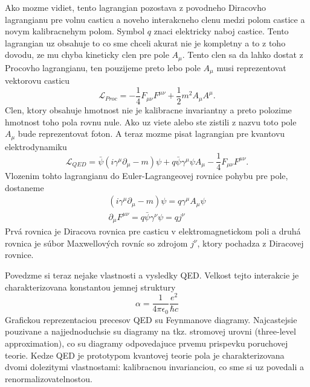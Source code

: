 \documentclass[../../main.tex]{subfiles}
\begin{document}
Ako mozme vidiet, tento lagrangian pozostava z povodneho Diracovho lagrangianu pre volnu casticu a noveho interakcneho clenu medzi polom castice a novym kalibracnehym polom. Symbol $q$ znaci elektricky naboj castice. Tento lagrangian uz obsahuje to co sme chceli akurat nie je kompletny a to z toho dovodu, ze mu chyba kineticky clen pre pole $A_{\mu}$. Tento clen sa da lahko dostat z Procovho lagrangianu, ten pouzijeme preto lebo pole $A_{\mu}$ musi reprezentovat vektorovu casticu
\begin{equation}
\mathcal{L}_{Proc}=-\frac{1}{4}F_{\mu\nu}F^{\mu\nu}+\frac{1}{2}m^2A_{\mu}A^{\mu}.
\end{equation}
Clen, ktory obsahuje hmotnost nie je kalibracne invariantny a preto polozime hmotnost toho pola rovnu nule. Ako uz viete alebo ste zistili z nazvu toto pole $A_{\mu}$ bude reprezentovat foton. A teraz mozme pisat lagrangian pre kvantovu elektrodynamiku
\begin{equation}
\mathcal{L}_{QED}=\bar{\psi}(i\gamma^{\mu}\partial_{\mu}-m)\psi+q\bar{\psi}\gamma^{\mu}\psi A_{\mu}-\frac{1}{4}F_{\mu\nu}F^{\mu\nu}.
\end{equation}
Vlozenim tohto lagrangianu do Euler-Lagrangeovej rovnice pohybu pre pole, dostaneme 
\begin{equation}
\begin{gathered}
(i\gamma^{\mu}\partial_{\mu}-m)\psi=q\gamma^{\mu}A_{\mu}\psi\\
\partial_{\mu}F^{\mu\nu}=q\bar{\psi}\gamma^{\nu}\psi=qj^{\nu}
\end{gathered}
\end{equation}
Prvá rovnica je Diracova rovnica pre casticu v elektromagnetickom poli a druhá rovnica je súbor Maxwellových rovníc so zdrojom $j^{\nu}$, ktory pochadza z Diracovej rovnice.\par
Povedzme si teraz nejake vlastnosti a vysledky QED.
Velkost tejto interakcie je charakterizovana konstantou jemnej struktury
\begin{equation}
\alpha=\frac{1}{4\pi \epsilon_0}\frac{e^2}{\hbar c}
\end{equation}
Grafickou reprezentaciou precesov QED su Feynmanove diagramy. Najcastejsie pouzivane a najjednoduchsie su diagramy na tkz. stromovej urovni (three-level approximation), co su diagramy odpovedajuce prvemu prispevku poruchovej teorie. Kedze QED je prototypom kvantovej teorie pola je charakterizovana dvomi dolezitymi vlastnostami: kalibracnou invarianciou, co sme si uz povedali a renormalizovatelnostou.\par
\end{document}
